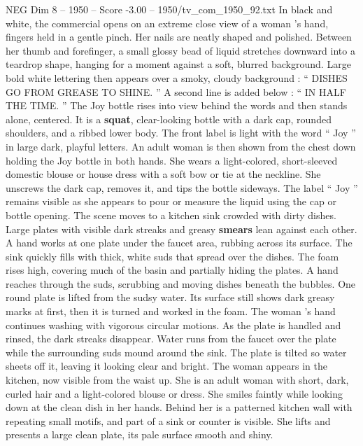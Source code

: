 \begin{textsample}{NEG Dim 8 – 1950 – Score -3.00 – 1950/tv\_com\_1950\_92.txt}  \label{ex:f8_neg_022}
In black and white, the commercial opens on an extreme close view of a woman ’s hand, fingers held in a gentle pinch.
Her nails are neatly shaped and polished.
Between her thumb and forefinger, a small glossy bead of liquid stretches downward into a teardrop shape, hanging for a moment against a soft, blurred background.
Large bold white lettering then appears over a smoky, cloudy background : “ DISHES GO FROM GREASE TO SHINE. ” A second line is added below : “ IN HALF THE TIME. ” The Joy bottle rises into view behind the words and then stands alone, centered.
It is a \textbf{squat}, clear-looking bottle with a dark cap, rounded shoulders, and a ribbed lower body.
The front label is light with the word “ Joy ” in large dark, playful letters.
An adult woman is then shown from the chest down holding the Joy bottle in both hands.
She wears a light-colored, short-sleeved domestic blouse or house dress with a soft bow or tie at the neckline.
She unscrews the dark cap, removes it, and tips the bottle sideways.
The label “ Joy ” remains visible as she appears to pour or measure the liquid using the cap or bottle opening.
The scene moves to a kitchen sink crowded with dirty dishes.
Large plates with visible dark streaks and greasy \textbf{smears} lean against each other.
A hand works at one plate under the faucet area, rubbing across its surface.
The sink quickly fills with thick, white suds that spread over the dishes.
The foam rises high, covering much of the basin and partially hiding the plates.
A hand reaches through the suds, scrubbing and moving dishes beneath the bubbles.
One round plate is lifted from the sudsy water.
Its surface still shows dark greasy marks at first, then it is turned and worked in the foam.
The woman ’s hand continues washing with vigorous circular motions.
As the plate is handled and rinsed, the dark streaks disappear.
Water runs from the faucet over the plate while the surrounding suds mound around the sink.
The plate is tilted so water sheets off it, leaving it looking clear and bright.
The woman appears in the kitchen, now visible from the waist up.
She is an adult woman with short, dark, curled hair and a light-colored blouse or dress.
She smiles faintly while looking down at the clean dish in her hands.
Behind her is a patterned kitchen wall with repeating small motifs, and part of a sink or counter is visible.
She lifts and presents a large clean plate, its pale surface smooth and shiny.

\end{textsample}
